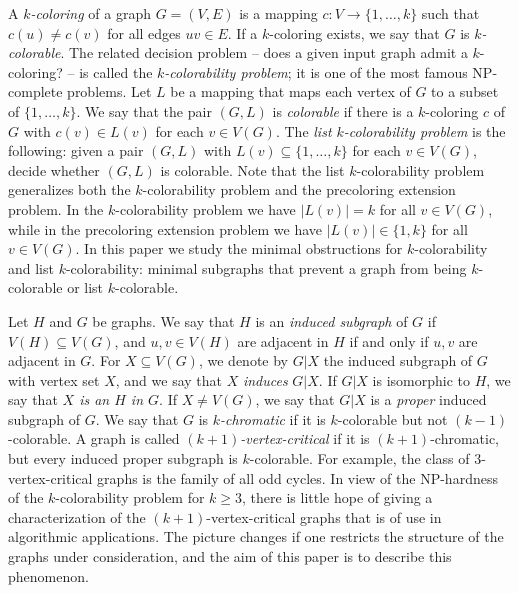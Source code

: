 \documentclass[11pt]{article}
\begin{document}
A \emph{$k$-coloring} of a graph $G=(V,E)$ is a mapping $c : V \to \{1,\ldots,k\}$ such that $c(u) \neq c(v)$ for all edges $uv \in E$.
If a $k$-coloring exists, we say that $G$ is \emph{$k$-colorable}.
The related decision problem -- does a given input graph admit a $k$-coloring? -- is called the \emph{$k$-colorability problem}; it is one of the most famous NP-complete problems.
Let $L$ be a mapping that maps each vertex of $G$ to a subset of $\{1,\ldots,k\}$.
We say that the pair $(G,L)$ is \emph{colorable} if there is a $k$-coloring $c$ of $G$ with $c(v) \in L(v)$ for each $v \in V(G)$.
The \emph{list $k$-colorability problem} is the following: given a pair $(G,L)$ with $L(v) \subseteq \{1,\ldots,k\}$ for each $v \in V(G)$, decide whether $(G,L)$ is colorable.
Note that the list $k$-colorability problem generalizes both the $k$-colorability problem and the precoloring extension problem.
In the $k$-colorability problem we have $|L(v)|=k$ for all $v \in V(G)$, while in the precoloring extension problem we have $|L(v)|\in \{1,k\}$ for all $v \in V(G)$.
In this paper we study the minimal obstructions for $k$-colorability and list $k$-colorability: minimal subgraphs that prevent a graph from being $k$-colorable or list $k$-colorable.

Let $H$ and $ G$ be graphs. We say that $H$ is an {\em induced subgraph} of $G$
if $V(H) \subseteq V(G)$, and $u,v \in V(H)$ are adjacent in $H$ if and
only if $u,v$ are adjacent in $G$. For   $X \subseteq V(G)$, we denote by
$G|X$ the induced subgraph of $G$ with vertex set $X$, and we say that
$X$ {\em induces} $G|X$. If $G|X$ is isomorphic to $H$, we say that 
{\em $X$ is an $H$ in $G$}.
If $X \neq V(G)$, we say that $G|X$ is a {\em proper} induced subgraph of $G$.
We say that $G$ is \emph{$k$-chromatic} if it is $k$-colorable but not 
$(k-1)$-colorable.
A graph is called \emph{$(k+1)$-vertex-critical} if it is $(k+1)$-chromatic, but every induced proper subgraph is $k$-colorable.
For example, the class of $3$-vertex-critical graphs is the family of all odd cycles.
In view of the NP-hardness of the $k$-colorability problem for $k\geq 3$, there is little hope of giving a characterization of the $(k+1)$-vertex-critical graphs that is of use in algorithmic applications.
The picture changes if one restricts the structure of the graphs under consideration, and the aim of this paper is to describe this phenomenon.
\end{document}
